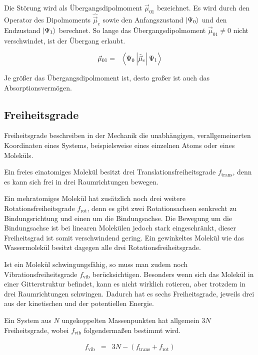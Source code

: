 \documentclass[12pt,a4paper]{scrartcl}
\numberwithin{equation}{section} %
\begin{document}
Die Störung wird als Übergangsdipolmoment $\vec\mu_{01}$ bezeichnet. Es wird durch den Operator des Dipolmoments $\hat {\vec \mu}_e$ sowie den Anfangszustand $\ket{\Psi_0}$ und den Endzustand $\ket{\Psi_1}$ berechnet. So lange das Übergangsdipolmoment $\vec\mu_{01}\neq0$ nicht verschwindet, ist der Übergang erlaubt.

\begin{eqnarray}
    \vec \mu_{01} &=& \expval{\Psi_0\left|\hat {\vec \mu}_e\right|\Psi_1}
\end{eqnarray}

\noindent
Je größer das Übergangsdipolmoment ist, desto großer ist auch das Absorptionsvermögen.

\hypertarget{freiheitsgrade}{%
\subsection{Freiheitsgrade}\label{freiheitsgrade}}

Freiheitsgrade beschreiben in der Mechanik die unabhängigen, verallgemeinerten Koordinaten eines Systems, beispielsweise eines einzelnen Atoms oder eines Moleküls.

Ein freies einatomiges Molekül besitzt drei Translationsfreiheitsgrade $f_\mathrm{trans}$, denn es kann sich frei in drei Raumrichtungen bewegen. \cite{Gerthsen}

Ein mehratomiges Molekül hat zusätzlich noch drei weitere Rotationsfreiheitsgrade $f_\mathrm{rot}$, denn es gibt zwei Rotationsachsen senkrecht zu Bindungsrichtung und einen um die Bindungsachse. Die Bewegung um die Bindungsachse ist bei linearen Molekülen jedoch stark eingeschränkt, dieser Freiheitsgrad ist somit verschwindend gering. \cite{Freiheitsgrad} Ein gewinkeltes Molekül wie das Wassermolekül besitzt dagegen alle drei Rotationsfreiheitsgrade. \cite{Gerthsen}

Ist ein Molekül schwingungsfähig, so muss man zudem noch Vibrationsfreiheitsgrade $f_\mathrm{vib}$ berücksichtigen. Besonders wenn sich das Molekül in einer Gitterstruktur befindet, kann es nicht wirklich rotieren, aber trotzdem in drei Raumrichtungen schwingen. Dadurch hat es sechs Freiheitsgrade, jeweils drei aus der kinetischen und der potentiellen Energie.

Ein System aus $N$ ungekoppelten Massenpunkten hat allgemein $3N$ Freiheitsgrade, wobei $f_\mathrm{vib}$ folgendermaßen bestimmt wird. \cite{Gerthsen}

\begin{eqnarray}
	 f_\mathrm{vib} &=& 3N - (f_\mathrm{trans} + f_\mathrm{rot})
\end{eqnarray}
\end{document}
